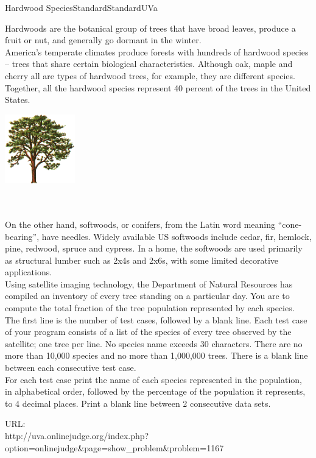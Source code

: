 \begin{problema}{Hardwood Species}{Standard}{Standard}{UVa}


\noindent\begin{minipage}{.80\textwidth}
  { 
  Hardwoods are the botanical group of trees that have broad leaves, produce a fruit or nut, and generally go dormant in the winter.\\
  
  America's temperate climates produce forests with hundreds of hardwood species -- trees that share certain biological characteristics. Although oak, maple and cherry all are types of hardwood trees, for example, they are different species. Together, all the hardwood species represent 40 percent of the trees in the United States. \\
  }
\end{minipage}%
\begin{minipage}{.20\textwidth}
  \centering
  \includegraphics[height=3cm]{graficos/tree}
\end{minipage}
\\
\\
On the other hand, softwoods, or conifers, from the Latin word meaning ``cone-bearing'', have needles. Widely available US softwoods include cedar, fir, hemlock, pine, redwood, spruce and cypress. In a home, the softwoods are used primarily as structural lumber such as 2x4s and 2x6s, with some limited decorative applications. \\

Using satellite imaging technology, the Department of Natural Resources has compiled an inventory of every tree standing on a particular day. You are to compute the total fraction of the tree population represented by each species. \\

The first line is the number of test cases, followed by a blank line. Each test case of your program consists of a list of the species of every tree observed by the satellite; one tree per line. No species name exceeds 30 characters. There are no more than 10,000 species and no more than 1,000,000 trees. There is a blank line between each consecutive test case. \\

For each test case print the name of each species represented in the population, in alphabetical order, followed by the percentage of the population it represents, to 4 decimal places. Print a blank line between 2 consecutive data sets.\\

\Example



URL: \\ http://uva.onlinejudge.org/index.php?\\
option=onlinejudge\&page=show\_problem\&problem=1167

\end{problema}
